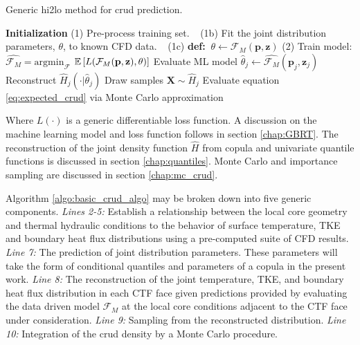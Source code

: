 \begin{algorithm}[H]
    \caption{Generic hi2lo method for crud prediction.}
    \begin{algorithmic}[1]
    \STATE \textbf{Initialization}
    \STATE (1) Pre-process training set.
    \STATE $\ \ $   (1b) Fit the joint distribution parameters, $\theta$, to known CFD data. 
    \STATE $\ \ $   (1c) \textbf{def:}  $\ \theta \leftarrow \mathcal F_M(\mathbf p, \mathbf z )$
    \STATE (2) Train model:  $\hat{\mathcal F_M} =  \mathrm{argmin}_{\mathcal F}$
      $\operatorname*{\mathbb{E}} \left[ L(\mathcal{F}_M (\mathbf p, \mathbf z), \theta) \right]$
    \STATE Evaluate ML model $\hat \theta_j \leftarrow \hat{\mathcal F_M}(\mathbf p_j, \mathbf z_j)$ \;
    \STATE Reconstruct $\hat H_j(\cdot |\hat \theta_j)$ \;
    \STATE Draw samples $\mathbf X \sim \hat H_j$ \;
    \STATE Evaluate equation \ref{eq:expected_crud} via Monte Carlo approximation \;
\ENDFOR
    \end{algorithmic}
\label{algo:basic_crud_algo}
\end{algorithm}
Where $L(\cdot)$ is a generic differentiable loss function.  A discussion on the machine learning model and loss function follows in section \ref{chap:GBRT}.  The reconstruction of the joint density function $\hat H$ from copula and univariate quantile functions is discussed in section \ref{chap:quantiles}.  Monte Carlo and importance sampling are discussed in section \ref{chap:mc_crud}.

Algorithm \ref{algo:basic_crud_algo} may be broken down into five generic components.  \emph{Lines 2-5:} Establish a relationship between the local core geometry and thermal hydraulic conditions to the behavior of surface temperature, TKE and boundary heat flux distributions using a pre-computed suite of CFD results. \emph{Line 7:} The prediction of joint distribution parameters. These parameters will take the form of conditional quantiles and parameters of a copula in the present work. \emph{Line 8:} The reconstruction of the joint temperature, TKE, and boundary heat flux distribution in each CTF face given predictions provided by evaluating the data driven model $\mathcal F_M$ at the local core conditions adjacent to the CTF face under consideration. \emph{Line 9:} Sampling from the reconstructed distribution.  \emph{Line 10:} Integration of the crud density by a Monte Carlo procedure.


